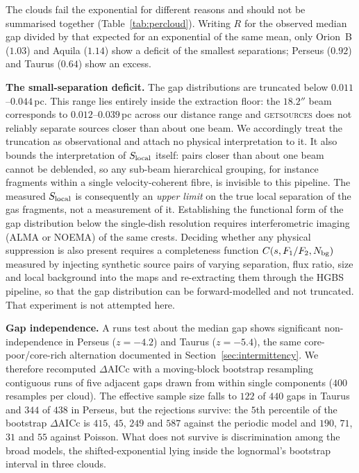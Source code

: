 \documentclass[usenatbib,twoside,twocolumn]{mnras}
\begin{document}
The clouds fail the exponential for different reasons and should not be summarised together (Table~\ref{tab:percloud}). Writing $R$ for the observed median gap divided by that expected for an exponential of the same mean, only Orion~B ($1.03$) and Aquila ($1.14$) show a deficit of the smallest separations; Perseus ($0.92$) and Taurus ($0.64$) show an excess.

\smallskip\noindent\textbf{The small-separation deficit.} The gap distributions are truncated below $0.011$--$0.044$\,pc. This range lies entirely inside the extraction floor: the $18.2''$ beam corresponds to $0.012$--$0.039$\,pc across our distance range and \textsc{getsources} does not reliably separate sources closer than about one beam. We accordingly treat the truncation as observational and attach no physical interpretation to it. It also bounds the interpretation of $S_{\rm local}$ itself: pairs closer than about one beam cannot be deblended, so any sub-beam hierarchical grouping, for instance fragments within a single velocity-coherent fibre, is invisible to this pipeline. The measured $S_{\rm local}$ is consequently an \emph{upper limit} on the true local separation of the gas fragments, not a measurement of it. Establishing the functional form of the gap distribution below the single-dish resolution requires interferometric imaging (ALMA or NOEMA) of the same crests. Deciding whether any physical suppression is also present requires a completeness function $C(s,F_1/F_2,N_{\rm bg})$ measured by injecting synthetic source pairs of varying separation, flux ratio, size and local background into the maps and re-extracting them through the HGBS pipeline, so that the gap distribution can be forward-modelled  and not truncated. That experiment is not attempted here.

\smallskip\noindent\textbf{Gap independence.} A runs test about the median gap shows significant non-independence in Perseus ($z=-4.2$) and Taurus ($z=-5.4$), the same core-poor/core-rich alternation documented in Section~\ref{sec:intermittency}. We therefore recomputed $\Delta$AICc with a moving-block bootstrap resampling contiguous runs of five adjacent gaps drawn from within single components ($400$ resamples per cloud). The effective sample size falls to $122$ of $440$ gaps in Taurus and $344$ of $438$ in Perseus, but the rejections survive: the $5$th percentile of the bootstrap $\Delta$AICc is $415$, $45$, $249$ and $587$ against the periodic model and $190$, $71$, $31$ and $55$ against Poisson. What does not survive is discrimination among the broad models, the shifted-exponential lying inside the lognormal's bootstrap interval in three clouds.
\end{document}
